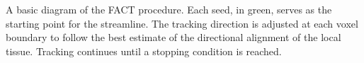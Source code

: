 \label{fig:tracking} A basic diagram of the FACT procedure. Each seed, in green, serves as the starting point for the streamline. The tracking direction is adjusted at each voxel boundary to follow the best estimate of the directional alignment of the local tissue. Tracking continues until a stopping condition is reached.